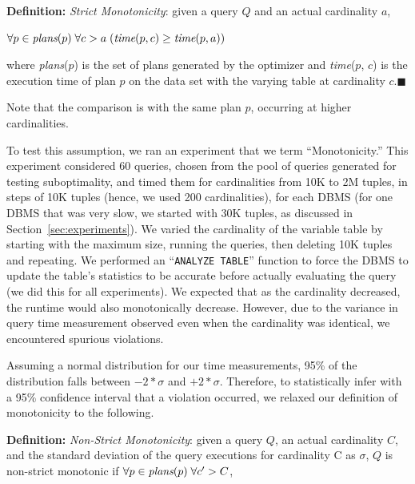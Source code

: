 \documentclass[prodmode,acmtods]{acmsmall}
\begin{document}
\vspace{1em}\noindent
{\bf Definition:} {\em Strict Monotonicity}: given a query $Q$ and an actual
cardinality $a$,

\quad\quad\quad\quad\quad$\forall p \in \hbox{\em plans} (p) \;\forall c > a \;( \hbox{\em time} (p,
c) \geq \hbox{\em time} (p,a) )$

\vspace{1em}\noindent
where {\em plans}($p$) is the set of plans generated by the optimizer and
{\em time}($p$, $c$) is the execution time of plan $p$ on the data set with
the varying table at cardinality $c$.\hfill$\blacksquare$

\vspace{1em}
\noindent
Note that the comparison is with the same plan $p$, occurring at higher
cardinalities.

To test this assumption, we ran an experiment that we term
``Monotonicity.'' This experiment considered 60 queries, chosen from the
pool of queries
generated for testing suboptimality, and timed them for cardinalities from 10K
to 2M tuples, in steps of 10K tuples (hence, we used 200 cardinalities), for
each \hbox{DBMS} (for one \hbox{DBMS} that was very slow, we started with 30K tuples, as
discussed in Section~\ref{sec:experiments}). We varied the cardinality of the variable table by starting with
the maximum size, running the queries, then deleting 10K tuples and repeating.
We performed an ``{\tt ANALYZE TABLE}'' function to force
the \hbox{DBMS} to update the table's statistics to be accurate before actually
evaluating the query (we did this for all experiments).
We expected that as the cardinality decreased,
the runtime would also monotonically decrease. However, due to the variance in query
time measurement observed even when the cardinality was identical, we encountered
spurious violations. 

Assuming a normal distribution for our time measurements, 95\% of 
the distribution falls between $-2*\sigma$ and $+2*\sigma$. 
Therefore, to statistically
infer with a 95\% confidence interval that a violation occurred, 
we relaxed our definition of monotonicity to the following.

\vspace{1em}\noindent
{\bf Definition:} {\em Non-Strict Monotonicity}: given a query $Q$, an actual
cardinality $C$, and the standard deviation of the query executions for
cardinality C as $\sigma$, $Q$ is non-strict monotonic if $\forall p \in
\hbox{\em plans} (p) \;\forall c^{\prime} > C $,
\end{document}

